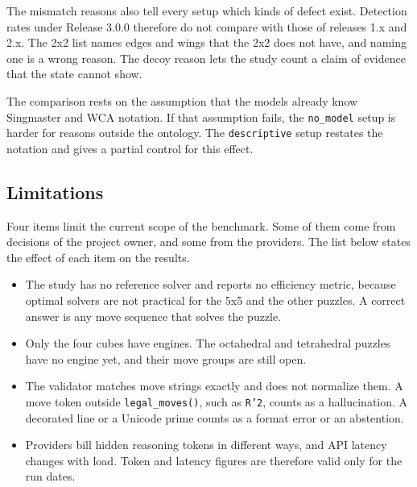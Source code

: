 \documentclass[10pt,twocolumn,letterpaper]{article}
\newcommand{\code}[1]{\texttt{#1}}
\begin{document}
The mismatch reasons also tell every setup which kinds of defect exist. Detection rates under Release 3.0.0 therefore do not compare with those of releases 1.x and 2.x. The 2x2 list names edges and wings that the 2x2 does not have, and naming one is a wrong reason. The decoy reason lets the study count a claim of evidence that the state cannot show.

The comparison rests on the assumption that the models already know Singmaster and WCA notation. If that assumption fails, the \code{no\_model} setup is harder for reasons outside the ontology. The \code{descriptive} setup restates the notation and gives a partial control for this effect.

\subsection{Limitations}\label{sec:limitations}
Four items limit the current scope of the benchmark. Some of them come from decisions of the project owner, and some from the providers. The list below states the effect of each item on the results.
\begin{itemize}[leftmargin=*,itemsep=1pt]
  \item The study has no reference solver and reports no efficiency metric, because optimal solvers are not practical for the 5x5 and the other puzzles. A correct answer is any move sequence that solves the puzzle.
  \item Only the four cubes have engines. The octahedral and tetrahedral puzzles have no engine yet, and their move groups are still open.
  \item The validator matches move strings exactly and does not normalize them. A move token outside \code{legal\_moves()}, such as \code{R'2}, counts as a hallucination. A decorated line or a Unicode prime counts as a format error or an abstention.
  \item Providers bill hidden reasoning tokens in different ways, and API latency changes with load. Token and latency figures are therefore valid only for the run dates.
\end{itemize}

\end{document}

